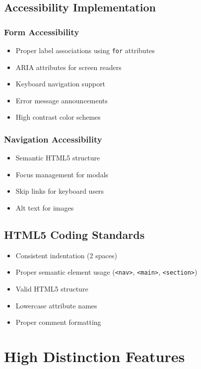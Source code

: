 \documentclass[12pt,a4paper]{article}
\begin{document}
\subsection{Accessibility Implementation}

\subsubsection{Form Accessibility}
\begin{itemize}
    \item Proper label associations using \texttt{for} attributes
    \item ARIA attributes for screen readers
    \item Keyboard navigation support
    \item Error message announcements
    \item High contrast color schemes
\end{itemize}

\subsubsection{Navigation Accessibility}
\begin{itemize}
    \item Semantic HTML5 structure
    \item Focus management for modals
    \item Skip links for keyboard users
    \item Alt text for images
\end{itemize}

\subsection{HTML5 Coding Standards}
\begin{itemize}
    \item Consistent indentation (2 spaces)
    \item Proper semantic element usage (\texttt{<nav>}, \texttt{<main>}, \texttt{<section>})
    \item Valid HTML5 structure
    \item Lowercase attribute names
    \item Proper comment formatting
\end{itemize}

\section{High Distinction Features}
\end{document}
